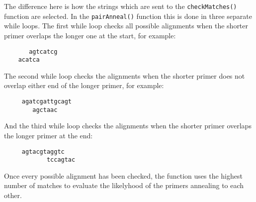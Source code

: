 The difference here is how the strings which are sent to the
\texttt{checkMatches()} function are selected. In the
\texttt{pairAnneal()} function this is done in three separate while
loops. The first while loop checks all possible alignments when the
shorter primer overlaps the longer one at the start, for example:
\begin{verbatim}
       agtcatcg
    acatca
\end{verbatim}
The second while loop checks the alignments when the shorter primer does
not overlap either end of the longer primer, for example:
\begin{verbatim}
     agatcgattgcagt
        agctaac
\end{verbatim}
And the third while loop checks the alignments when the shorter primer
overlaps the longer primer at the end:
\begin{verbatim}
     agtacgtaggtc
            tccagtac
\end{verbatim}
Once every possible alignment has been checked, the function uses the
highest number of matches to evaluate the likelyhood of the primers
annealing to each other.














